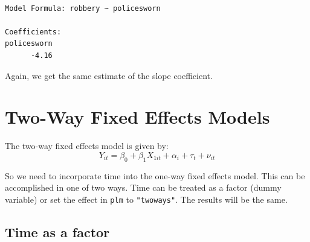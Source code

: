 \documentclass[]{book}
\newenvironment{Shaded}{\begin{snugshade}}{\end{snugshade}}
\newcommand{\CommentTok}[1]{\textcolor[rgb]{0.56,0.35,0.01}{\textit{#1}}}
\newcommand{\DataTypeTok}[1]{\textcolor[rgb]{0.13,0.29,0.53}{#1}}
\newcommand{\DecValTok}[1]{\textcolor[rgb]{0.00,0.00,0.81}{#1}}
\newcommand{\KeywordTok}[1]{\textcolor[rgb]{0.13,0.29,0.53}{\textbf{#1}}}
\newcommand{\NormalTok}[1]{#1}
\newcommand{\OperatorTok}[1]{\textcolor[rgb]{0.81,0.36,0.00}{\textbf{#1}}}
\newcommand{\StringTok}[1]{\textcolor[rgb]{0.31,0.60,0.02}{#1}}
\begin{document}
\begin{verbatim}

Model Formula: robbery ~ policesworn

Coefficients:
policesworn 
      -4.16 
\end{verbatim}

Again, we get the same estimate of the slope coefficient.

\hypertarget{two-way-fixed-effects-models}{%
\section{Two-Way Fixed Effects Models}\label{two-way-fixed-effects-models}}

The two-way fixed effects model is given by:\[Y_{it}=\beta_0+\beta_1X_{1it}+\alpha_i+\tau_t+\nu_{it}\]

So we need to incorporate time into the one-way fixed effects model. This can be accomplished in one of two ways. Time can be treated as a factor (dummy variable) or set the effect in \texttt{plm} to \texttt{"twoways"}. The results will be the same.

\hypertarget{time-as-a-factor}{%
\subsection{Time as a factor}\label{time-as-a-factor}}

\begin{Shaded}
\end{Shaded}
\end{document}
